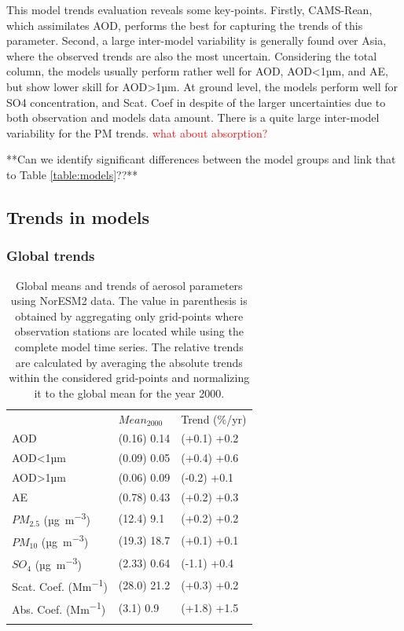\documentclass[journal abbreviation, manuscript]{copernicus}
\begin{document}
This model trends evaluation reveals some key-points. Firstly, CAMS-Rean, which assimilates AOD, performs the best for capturing the trends of this parameter. Second, a large inter-model variability is generally found over Asia, where the observed trends are also the most uncertain.
Considering the total column, the models usually perform rather well for AOD, AOD<1µm, and AE, but show lower skill for AOD>1µm. At ground level, the models perform well for SO4 concentration, and Scat. Coef in despite of the larger uncertainties due to both observation and models data amount. There is a quite large inter-model variability for the PM trends. \textcolor{red}{what about absorption?}

**Can we identify significant differences between the model groups and link that to Table \ref{table:models}??**

\subsection{Trends in models}

\subsubsection{Global trends}

\begin{table}
 \begin{tabular}{lll}
  \tophline
                                & $Mean_{2000}$ & Trend (\%/yr) \\
  \middlehline
  AOD                           & (0.16) 0.14   & (+0.1) +0.2   \\
  AOD<1µm                       & (0.09) 0.05   & (+0.4) +0.6   \\
  AOD>1µm                       & (0.06) 0.09   & (-0.2) +0.1   \\
  AE                            & (0.78) 0.43   & (+0.2) +0.3   \\
  $PM_{2.5}$ (\unit{µg.m^{-3}}) & (12.4) 9.1    & (+0.2) +0.2   \\
  $PM_{10}$ (\unit{µg.m^{-3}})  & (19.3) 18.7   & (+0.1) +0.1   \\
  $SO_{4}$ (\unit{µg.m^{-3}})   & (2.33) 0.64   & (-1.1) +0.4   \\
  Scat. Coef. (\unit{Mm^{-1}})  & (28.0) 21.2   & (+0.3) +0.2   \\
  Abs. Coef. (\unit{Mm^{-1}})   & (3.1) 0.9     & (+1.8) +1.5   \\
  \bottomhline
 \end{tabular}
 \caption{Global means and trends of aerosol parameters using NorESM2 data. The value in parenthesis is obtained by aggregating only grid-points where observation stations are located while using the complete model time series. The relative trends are calculated by averaging the absolute trends within the considered grid-points and normalizing it to the global mean for the year 2000.}
 \label{table:global_trends}
\end{table}
\end{document}
